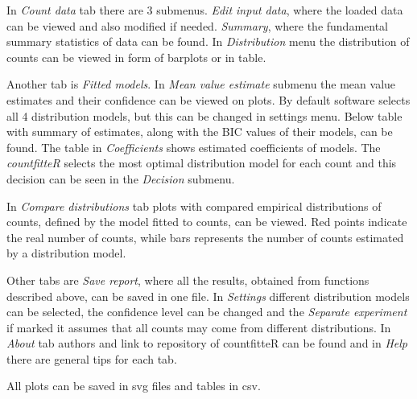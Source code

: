 In \textit{Count data} tab there are 3 submenus. \textit{Edit input data}, where the loaded data can be viewed and also modified if needed. \textit{Summary}, where the fundamental summary statistics of data can be found. In \textit{Distribution} menu the distribution of counts can be viewed in form of barplots or in table.

Another tab is \textit{Fitted models}. In \textit{Mean value estimate} submenu the mean value estimates and their confidence can be viewed on  plots. By default software selects all 4 distribution models, but this can be changed in settings menu. Below table with summary of estimates, along with the BIC values of their models, can be found. The table in \textit{Coefficients} shows estimated coefficients of models. The \emph{countfitteR} selects the most optimal distribution model for each count and this decision can be seen in the \textit{Decision} submenu.

In \textit{Compare distributions} tab plots with compared empirical distributions of counts, defined by the model fitted to counts, can be viewed. Red points indicate the real number of counts, while bars represents the number of counts estimated by a distribution model.

Other tabs are \textit{Save report}, where all the results, obtained from functions described above, can be saved in one file. In \textit{Settings} different distribution models can be selected, the confidence level can be changed and the \textit{Separate experiment} if marked it assumes that all counts may come from different distributions. In \textit{About} tab authors and link to repository of countfitteR can be found and in \textit{Help} there are general tips for each tab. 

All plots can be saved in svg files and tables in csv.

